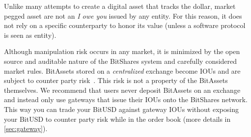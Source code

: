 Unlike many attempts to create a digital asset that tracks the dollar, market
pegged asset are not an \emph{I owe you} issued by any entity. For this reason,
it does not rely on a specific counterparty to honor its value (unless a
software protocol is seen as entity). 

Although manipulation risk occurs in any market, it is minimized by the open
source and auditable nature of the BitShares system and carefully considered
market rules. BitAssets stored on a \emph{centralized} exchange become IOUs and
are subject to counter party risk~\cite{mtgox}. This risk is not a property of
the BitAssets themselves. We recommend that users never deposit BitAssets on an
exchange and instead only use gateways that issue their IOUs onto the BitShares
network. This way you can trade your BitUSD against gateway IOUs without
exposing your BitUSD to counter party risk while in the order book (more
details in \cref{sec:gateway}).
